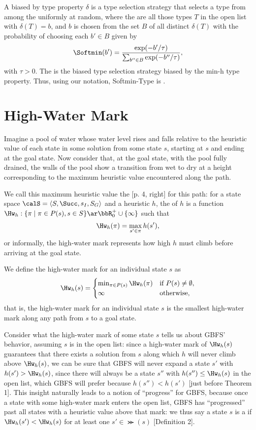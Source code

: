 A  biased by type property $\delta$ is a type selection strategy that selects a type from among the  uniformly at random, where the  are all those types $T$ in the open list with $\delta(T)=b$, and $b$ is chosen from the set $B$ of all distinct $\delta(T)$ with the probability of choosing each $b'\in B$ given by $$\Softmin(b')=\frac{\exp(-b'/\tau)}{\sum_{b''\in B}\exp(-b''/\tau)},$$ with $\tau>0$. The  is the biased type selection strategy biased by the min-h type property. Thus, using our notation, Softmin-Type is \kw{\hgHu}.

\section{High-Water Mark}
\label{sec:hw}

Imagine a pool of water whose water level rises and falls relative to the heuristic value of each state in some solution from some state $s$, starting at $s$ and ending at the goal state. Now consider that, at the goal state, with the pool fully drained, the walls of the pool show a transition from wet to dry at a height corresponding to the maximum heuristic value encountered along the path.

We call this maximum heuristic value the  [p. 4, right] for this path: for a state space $\calS=\langle S,\Succ,s_I,S_G\rangle$ and a heuristic $h$, the  of $h$ is a function $\Hw_h:\{\pi\mid \pi\in P(s),s\in S\}\ar\bbR_0^+\cup\{\infty\}$ such that $$\Hw_h(\pi)=\max_{s'\in\pi}h(s'),$$ or informally, the high-water mark represents how high $h$ must climb before arriving at the goal state.

We define the high-water mark for an individual state $s$ as $$\Hw_h(s)=\begin{cases}\min_{\pi\in P(s)}\Hw_h(\pi)&\text{if }P(s)\neq\emptyset,\\\infty&\text{otherwise,}\end{cases}$$ that is, the high-water mark for an individual state $s$ is the smallest high-water mark along any path from $s$ to a goal state.

Consider what the high-water mark of some state $s$ tells us about GBFS' behavior, assuming $s$ is in the open list: since a high-water mark of $\Hw_h(s)$ guarantees that there exists a solution from $s$ along which $h$ will never climb above $\Hw_h(s)$, we can be sure that GBFS will never expand a state $s'$ with $h(s')>\Hw_h(s)$, since there will always be a state $s''$ with $h(s'')\leq\Hw_h(s)$ in the open list, which GBFS will prefer because $h(s'')<h(s')$ [just before Theorem 1]. This insight naturally leads to a notion of ``progress'' for GBFS, because once a state with some high-water mark enters the open list, GBFS has ``progressed'' past all states with a heuristic value above that mark: we thus say a state $s$ is a  if $\Hw_h(s')<\Hw_h(s)$ for at least one $s'\in\Succ(s)$ [Definition 2].

